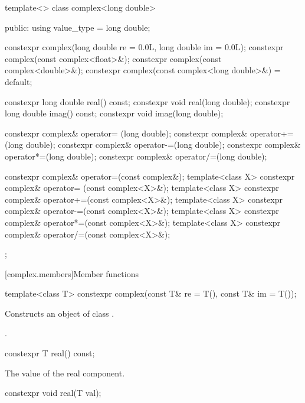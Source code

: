 \begin{codeblock}
{  template<> class complex<long double> {
  public:
    using value_type = long double;

    constexpr complex(long double re = 0.0L, long double im = 0.0L);
    constexpr complex(const complex<float>&);
    constexpr complex(const complex<double>&);
    constexpr complex(const complex<long double>&) = default;

    constexpr long double real() const;
    constexpr void real(long double);
    constexpr long double imag() const;
    constexpr void imag(long double);

    constexpr complex& operator= (long double);
    constexpr complex& operator+=(long double);
    constexpr complex& operator-=(long double);
    constexpr complex& operator*=(long double);
    constexpr complex& operator/=(long double);

    constexpr complex& operator=(const complex&);
    template<class X> constexpr complex& operator= (const complex<X>&);
    template<class X> constexpr complex& operator+=(const complex<X>&);
    template<class X> constexpr complex& operator-=(const complex<X>&);
    template<class X> constexpr complex& operator*=(const complex<X>&);
    template<class X> constexpr complex& operator/=(const complex<X>&);
  };
}
\end{codeblock}

[complex.members]{Member functions}

%
\begin{itemdecl}
template<class T> constexpr complex(const T& re = T(), const T& im = T());
\end{itemdecl}

\begin{itemdescr}
\pnum
\effects
Constructs an object of class
.

\pnum
\ensures
{}.
\end{itemdescr}

%
\begin{itemdecl}
constexpr T real() const;
\end{itemdecl}

\begin{itemdescr}
\pnum
\returns The value of the real component.
\end{itemdescr}

%
\begin{itemdecl}
constexpr void real(T val);
\end{itemdecl}

